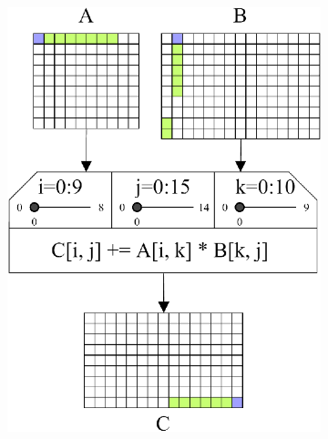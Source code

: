 \begin{figure}
	\centering
	\begin{subfigure}[c]{.54\linewidth}
		\centering
		\includegraphics[width=\linewidth]{pictures/boosting_cache_lines.png}
	\end{subfigure}
	\begin{subfigure}[c]{.44\linewidth}
		\centering

\end{subfigure}
\end{figure}
